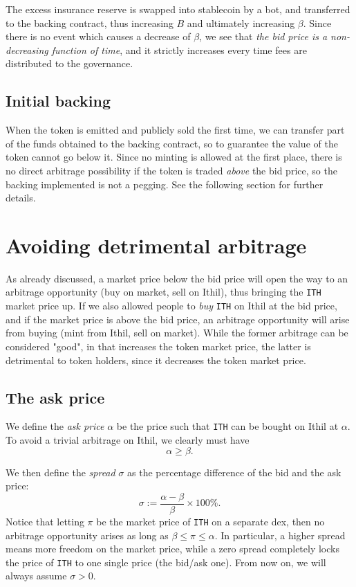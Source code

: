 \documentclass[a4paper,10 pt]{article}
\theoremstyle{definition}
\begin{document}
The excess insurance reserve is swapped into stablecoin by a bot, and transferred to the backing contract, thus increasing $B$ and ultimately increasing $\beta$. Since there is no event which causes a decrease of $\beta$, we see that {\it the bid price is a non-decreasing function of time}, and it strictly increases every time fees are distributed to the governance.

\subsection{Initial backing}

When the token is emitted and publicly sold the first time, we can transfer part of the funds obtained to the backing contract, so to guarantee the value of the token cannot go below it. Since no minting is allowed at the first place, there is no direct arbitrage possibility if the token is traded {\it above} the bid price, so the backing implemented is not a pegging. See the following section for further details.

\section{Avoiding detrimental arbitrage}

As already discussed, a market price below the bid price will open the way to an arbitrage opportunity (buy on market, sell on Ithil), thus bringing the \verb|ITH| market price up. If we also allowed people to {\it buy} \verb|ITH| on Ithil at the bid price, and if the market price is above the bid price, an arbitrage opportunity will arise from buying (mint from Ithil, sell on market). While the former arbitrage can be considered "good", in that increases the token market price, the latter is detrimental to token holders, since it decreases the token market price.

\subsection{The ask price}
We define the {\it ask price} $\alpha$ be the price such that \verb|ITH| can be bought on Ithil at $\alpha$. To avoid a trivial arbitrage on Ithil, we clearly must have $$\alpha \ge \beta.$$

We then define the {\it spread} $\sigma$ as the percentage difference of the bid and the ask price: $$\sigma := \frac{\alpha-\beta}{\beta} \times 100\%.$$
Notice that letting $\pi$ be the market price of \verb|ITH| on a separate dex, then no arbitrage opportunity arises as long as $\beta \le \pi \le \alpha$. In particular, a higher spread means more freedom on the market price, while a zero spread completely locks the price of \verb|ITH| to one single price (the bid/ask one).  From now on, we will always assume $\sigma > 0$.
\end{document}
